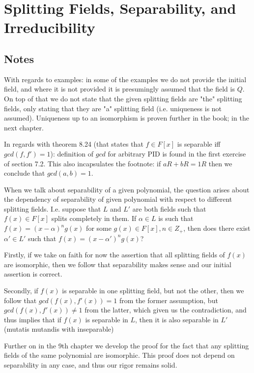 \documentclass[11pt,oneside,titlepage]{book}
\begin{document}
\section{Splitting Fields, Separability, and Irreducibility}

\subsection*{Notes}

With regards to examples: in some of the examples we do not provide
the initial field, and where it is not provided it is presumingly assumed
that the field is $Q$. On top of that we do not state that the given
splitting fields are "the" splitting fields, only stating that they
are "a" splitting field (i.e. uniqueness is not assumed). Uniqueness
up to an isomorphism is proven further in the book; in the next chapter.

In regards with theorem 8.24 (that states that $f \in F[x]$ is
separable iff $gcd(f, f') = 1$): definition of $gcd$ for arbitrary PID is
found in the first exercise of section 7.2. This also incapsulates the
footnote: if $aR + bR = 1R$ then we conclude that $gcd(a, b) = 1$.

When we talk about separability of a given polynomial, the question
arises about the dependency of separability of given polynomial with
respect to different splitting fields. I.e. suppose that $L$ and $L'$
are both fields such that $f(x) \in F[x]$ splits completely in them.
If $\alpha \in L$ is such that $f(x) = (x - \alpha)^n g(x)$ for some
$g(x) \in F[x], n \in Z_+$, then does there exist $\alpha' \in L'$ such that
$f(x) = (x - \alpha')^ng(x)$?

Firstly, if we take on faith for now the assertion that all
splitting fields of $f(x)$ are isomorphic, then we follow that
separability makes sense and our initial assertion is correct.

Secondly, if $f(x)$ is separable in one splitting field, but not the
other, then we follow that $gcd(f(x), f'(x)) = 1$ from the former
assumption, but $gcd(f(x), f'(x)) \neq 1$ from the latter, which given
us the contradiction, and thus implies that if $f(x)$ is separable in
$L$, then it is also separable in $L'$ (mutatis mutandis with
inseparable)

Further on in the 9th chapter we develop the proof for the fact that
any splitting fields of the same polynomial are isomorphic. This proof
does not depend on separability in any case, and thus our rigor
remains solid.
\end{document}
